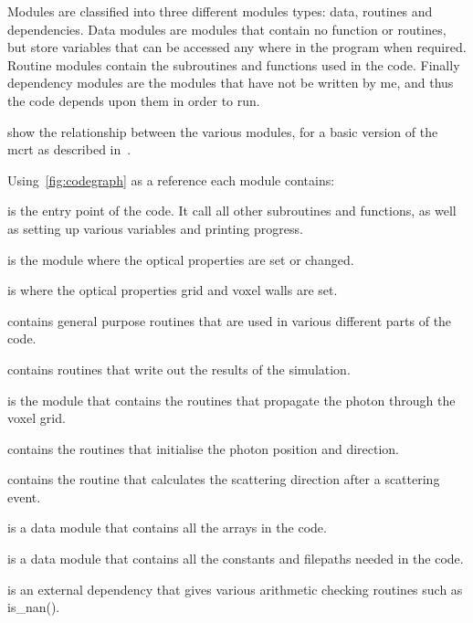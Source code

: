 Modules are classified into three different modules types: data, routines and dependencies.
Data modules are modules that contain no function or routines, but store variables that can be accessed any where in the program when required.
Routine modules contain the subroutines and functions used in the code.
Finally dependency modules are the modules that have not be written by me, and thus the code depends upon them in order to run.

 show the relationship between the various modules, for a basic version of the \gls*{mcrt} as described in~.

\medskip
\indent Using~\cref{fig:codegraph} as a reference each module contains:

 is the entry point of the code. It call all other subroutines and functions, as well as setting up various variables and printing progress.

 is the module where the optical properties are set or changed.

 is where the optical properties grid and voxel walls are set.

 contains general purpose routines that are used in various different parts of the code.

 contains routines that write out the results of the simulation.

 is the module that contains the routines that propagate the photon through the voxel grid.

 contains the routines that initialise the photon position and direction.

 contains the routine that calculates the scattering direction after a scattering event.

 is a data module that contains all the arrays in the code.

 is a data module that contains all the constants and filepaths needed in the code.

 is an external dependency that gives various arithmetic checking routines such as is_nan().

